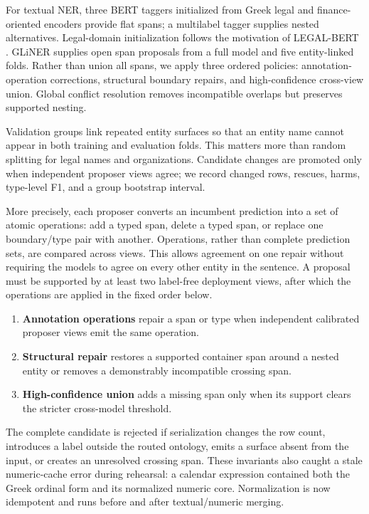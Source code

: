 \documentclass[11pt]{article}
\begin{document}
For textual NER, three BERT taggers initialized from Greek legal and finance-oriented encoders provide flat spans; a multilabel tagger supplies nested alternatives. Legal-domain initialization follows the motivation of LEGAL-BERT \citep{chalkidis-etal-2020-legal}. GLiNER \citep{zaratiana-etal-2024-gliner} supplies open span proposals from a full model and five entity-linked folds. Rather than union all spans, we apply three ordered policies: annotation-operation corrections, structural boundary repairs, and high-confidence cross-view union. Global conflict resolution removes incompatible overlaps but preserves supported nesting.

Validation groups link repeated entity surfaces so that an entity name cannot appear in both training and evaluation folds. This matters more than random splitting for legal names and organizations. Candidate changes are promoted only when independent proposer views agree; we record changed rows, rescues, harms, type-level F1, and a group bootstrap interval.

More precisely, each proposer converts an incumbent prediction into a set of
atomic operations: add a typed span, delete a typed span, or replace one
boundary/type pair with another.  Operations, rather than complete prediction
sets, are compared across views.  This allows agreement on one repair without
requiring the models to agree on every other entity in the sentence.  A
proposal must be supported by at least two label-free deployment views, after
which the operations are applied in the fixed order below.

\begin{enumerate}
\item \textbf{Annotation operations} repair a span or type when independent
  calibrated proposer views emit the same operation.
\item \textbf{Structural repair} restores a supported container span around a
  nested entity or removes a demonstrably incompatible crossing span.
\item \textbf{High-confidence union} adds a missing span only when its support
  clears the stricter cross-model threshold.
\end{enumerate}

The complete candidate is rejected if serialization changes the row count,
introduces a label outside the routed ontology, emits a surface absent from the
input, or creates an unresolved crossing span.  These invariants also caught a
stale numeric-cache error during rehearsal: a calendar expression contained
both the Greek ordinal form and its normalized numeric core.  Normalization is
now idempotent and runs before and after textual/numeric merging.
\end{document}
